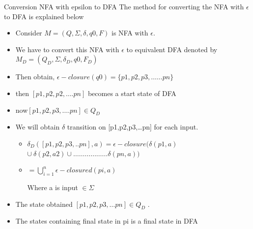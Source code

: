 \documentclass{beamer}
\begin{document}
\begin{frame}{Conversion NFA with epsilon to DFA }
	The method for converting the NFA with $\epsilon$ to DFA is explained below
	\begin{itemize}
		\item Consider $M=(Q, \Sigma, \delta ,q0,F)$ is NFA with $\epsilon$.
		\item  We have to convert this NFA with $\epsilon$ to equivalent DFA denoted by $M_D=(Q_D,\Sigma, \delta_D,q0,F_D)$
		 
			\item Then obtain, $\epsilon-closure(q0) =\{p1,p2,p3,……pn\}$
			\item then $[p1,p2,p2,….pn]$ becomes a start state of DFA
			\item now$[p1,p2,p3,….pn] \in Q_D$
		
		\item We will obtain $\delta$ transition on [p1,p2,p3,…pn] for each input.
		
		\begin{itemize}
			 \item $\delta_D([p1,p2,p3,..pn],a) = \epsilon -closure(\delta(p1,a)$
		 $\cup\  \delta(p2,a2)\cup……………… \delta(pn,a))$
			
			\item $= \bigcup\limits_{i=1}^{n}  \epsilon-closure d(pi,a)$
			
			Where a is input $\in \Sigma$
		\end{itemize}
	\item The state obtained $[p1,p2,p3,…pn] \in Q_D$ .
	
	\item The states containing final state in pi is a final state in DFA
	\end{itemize}
\end{frame}
\end{document}
